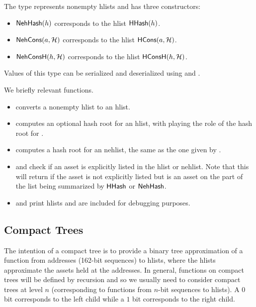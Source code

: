 The type {} represents nonempty hlists and has three constructors:
\begin{itemize}
\item ${\constr{NehHash}}(h)$ corresponds to the hlist ${\constr{HHash}}(h)$.
\item ${\constr{NehCons}}(a,\cH)$ corresponds to the hlist ${\constr{HCons}}(a,\cH)$.
\item ${\constr{NehConsH}}(h,\cH)$ corresponds to the hlist ${\constr{HConsH}}(h,\cH)$.
\end{itemize}
Values of this type can be serialized and deserialized using
{}
and
{}.

We briefly relevant functions.
\begin{itemize}
\item {} converts a nonempty hlist to an hlist.
\item {} computes an optional hash root for an hlist, with {} playing
the role of the hash root for {}.
\item {} computes a hash root for an nehlist,
the same as the one given by {}.
\item {} and {} check if an asset is explicitly listed in
the hlist or nehlist. Note that this will return {} if the asset is not explicitly listed
but is an asset on the part of the list being summarized by ${\constr{HHash}}$ or ${\constr{NehHash}}$.
\item {} and {} print hlists and are included for debugging purposes.
\end{itemize}

\subsection{Compact Trees}

The intention of a compact tree is to provide a binary tree approximation of
a function from addresses (162-bit sequences) to hlists, where the hlists
approximate the assets held at the addresses.
In general, functions on compact trees will be defined by recursion and so we
usually need to consider compact trees at level $n$ (corresponding to functions
from $n$-bit sequences to hlists).
A $0$ bit corresponds to the left child while a $1$ bit corresponds to the right child.

